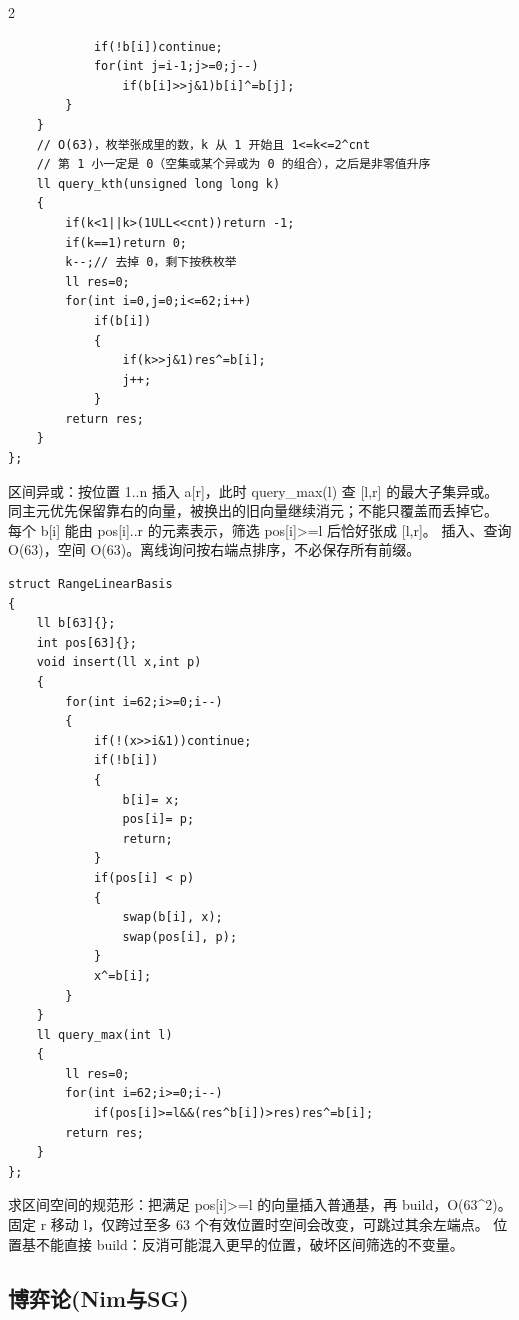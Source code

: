 \documentclass[UTF8,fontset=fandol,a4paper,twoside]{ctexart}
\newcommand{\note}[1]{{\fontsize{10}{12}\selectfont #1\par}}
\begin{document}
\begin{multicols}{2}
\begin{lstlisting}
            if(!b[i])continue;
            for(int j=i-1;j>=0;j--)
                if(b[i]>>j&1)b[i]^=b[j];
        }
    }
    // O(63)，枚举张成里的数，k 从 1 开始且 1<=k<=2^cnt
    // 第 1 小一定是 0（空集或某个异或为 0 的组合），之后是非零值升序
    ll query_kth(unsigned long long k)
    {
        if(k<1||k>(1ULL<<cnt))return -1;
        if(k==1)return 0;
        k--;// 去掉 0，剩下按秩枚举
        ll res=0;
        for(int i=0,j=0;i<=62;i++)
            if(b[i])
            {
                if(k>>j&1)res^=b[i];
                j++;
            }
        return res;
    }
};
\end{lstlisting}
\note{区间异或：按位置 1.\allowbreak{}.\allowbreak{}n 插入 a[\allowbreak{}r]\allowbreak{}，此时 query\_max(\allowbreak{}l)\allowbreak{} 查 [\allowbreak{}l,\allowbreak{}r]\allowbreak{} 的最大子集异或。 同主元优先保留靠右的向量，被换出的旧向量继续消元；不能只覆盖而丢掉它。 每个 b[\allowbreak{}i]\allowbreak{} 能由 pos[\allowbreak{}i]\allowbreak{}.\allowbreak{}.\allowbreak{}r 的元素表示，筛选 pos[\allowbreak{}i]\allowbreak{}>\allowbreak{}=\allowbreak{}l 后恰好张成 [\allowbreak{}l,\allowbreak{}r]\allowbreak{}。 插入、查询 O(\allowbreak{}63)\allowbreak{}，空间 O(\allowbreak{}63)\allowbreak{}。离线询问按右端点排序，不必保存所有前缀。}
\begin{lstlisting}
struct RangeLinearBasis
{
    ll b[63]{};
    int pos[63]{};
    void insert(ll x,int p)
    {
        for(int i=62;i>=0;i--)
        {
            if(!(x>>i&1))continue;
            if(!b[i])
            {
                b[i]= x;
                pos[i]= p;
                return;
            }
            if(pos[i] < p)
            {
                swap(b[i], x);
                swap(pos[i], p);
            }
            x^=b[i];
        }
    }
    ll query_max(int l)
    {
        ll res=0;
        for(int i=62;i>=0;i--)
            if(pos[i]>=l&&(res^b[i])>res)res^=b[i];
        return res;
    }
};
\end{lstlisting}
\note{求区间空间的规范形：把满足 pos[\allowbreak{}i]\allowbreak{}>\allowbreak{}=\allowbreak{}l 的向量插入普通基，再 build，O(\allowbreak{}63\textasciicircum{}2)\allowbreak{}。 固定 r 移动 l，仅跨过至多 63 个有效位置时空间会改变，可跳过其余左端点。 位置基不能直接 build：反消可能混入更早的位置，破坏区间筛选的不变量。}
\subsection{博弈论(Nim与SG)}


\end{multicols}
\end{document}
